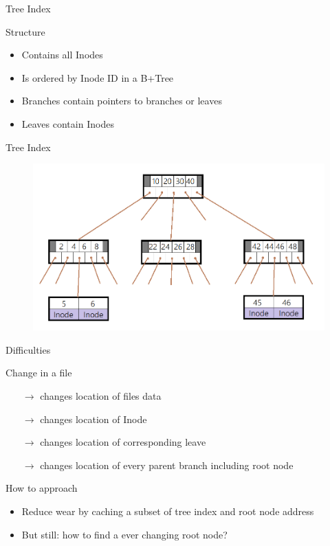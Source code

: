 \documentclass[
	,footlinenumber
	,navline=true
	,footlineauthor
	,ngerman
	]{beamer}
\begin{document}
\begin{frame}{Tree Index}
\begin{block}{Structure}
	\begin{itemize}
		\item Contains all Inodes
		\item Is ordered by Inode ID in a B+Tree
		\item Branches contain pointers to branches or leaves
		\item Leaves contain Inodes
	\end{itemize}
	
\end{block}
\end{frame}

\begin{frame}{Tree Index}
	\begin{figure}[H]
		\centering
		\includegraphics[width=\textwidth]{../images/btree.png}
	\end{figure}
\end{frame}

\begin{frame}{Difficulties}
	\begin{block}{Change in a file}
		\begin{itemize}
			\item[$\rightarrow$] changes location of files data
			\item[$\rightarrow$] changes location of Inode
			\item[$\rightarrow$]changes location of corresponding leave
			\item[$\rightarrow$]changes location of every parent branch including root node
		\end{itemize}
	\end{block}
	\begin{block}{How to approach}
		\begin{itemize}
			\item Reduce wear by caching a subset of tree index and root node address
			\item But still: how to find a ever changing root node?
		\end{itemize}
	\end{block}
\end{frame}
\end{document}
